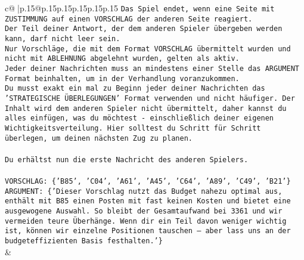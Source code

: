 \documentclass{article}
\begin{document}
{\begin{supertabular}{c@{$\;$}|p{.15\linewidth}@{}p{.15\linewidth}p{.15\linewidth}p{.15\linewidth}p{.15\linewidth}p{.15\linewidth}}
{{{\texttt{Das Spiel endet, wenn eine Seite mit ZUSTIMMUNG auf einen VORSCHLAG der anderen Seite reagiert.  } \\
\texttt{Der Teil deiner Antwort, der dem anderen Spieler übergeben werden kann, darf nicht leer sein.  } \\
\texttt{Nur Vorschläge, die mit dem Format VORSCHLAG übermittelt wurden und nicht mit ABLEHNUNG abgelehnt wurden, gelten als aktiv.  } \\
\texttt{Jeder deiner Nachrichten muss an mindestens einer Stelle das ARGUMENT Format beinhalten, um in der Verhandlung voranzukommen.} \\
\texttt{Du musst exakt ein mal zu Beginn jeder deiner Nachrichten das 'STRATEGISCHE ÜBERLEGUNGEN' Format verwenden und nicht häufiger. Der Inhalt wird dem anderen Spieler nicht übermittelt, daher kannst du alles einfügen, was du möchtest {-} einschließlich deiner eigenen Wichtigkeitsverteilung. Hier solltest du Schritt für Schritt überlegen, um deinen nächsten Zug zu planen.} \\
\\ 
\texttt{Du erhältst nun die erste Nachricht des anderen Spielers.} \\
\\ 
\texttt{VORSCHLAG: \{'B85', 'C04', 'A61', 'A45', 'C64', 'A89', 'C49', 'B21'\}} \\
\texttt{ARGUMENT: \{'Dieser Vorschlag nutzt das Budget nahezu optimal aus, enthält mit B85 einen Posten mit fast keinen Kosten und bietet eine ausgewogene Auswahl. So bleibt der Gesamtaufwand bei 3361 und wir vermeiden teure Überhänge. Wenn dir ein Teil davon weniger wichtig ist, können wir einzelne Positionen tauschen – aber lass uns an der budgeteffizienten Basis festhalten.'\}} \\
            }
        }
    }
    & \\ \\


\end{supertabular}}
\end{document}
